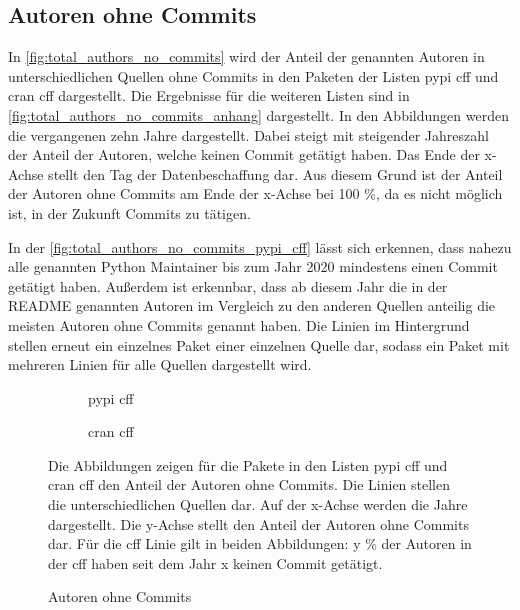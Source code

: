 \subsection*{Autoren ohne Commits}
In \autoref{fig:total_authors_no_commits} wird der Anteil der genannten Autoren in unterschiedlichen Quellen ohne Commits in den Paketen der Listen \gls{pypi} \gls{cff} und \gls{cran} \gls{cff} dargestellt.
Die Ergebnisse für die weiteren Listen sind in \autoref{fig:total_authors_no_commits_anhang} dargestellt.
In den Abbildungen werden die vergangenen zehn Jahre dargestellt.
Dabei steigt mit steigender Jahreszahl der Anteil der Autoren, welche keinen Commit getätigt haben.
Das Ende der x-Achse stellt den Tag der Datenbeschaffung dar.
Aus diesem Grund ist der Anteil der Autoren ohne Commits am Ende der x-Achse bei 100 \%, da es nicht möglich ist, in der Zukunft Commits zu tätigen.

In der \autoref{fig:total_authors_no_commits_pypi_cff} lässt sich erkennen, dass nahezu alle genannten Python Maintainer bis zum Jahr 2020 mindestens einen Commit getätigt haben.
Außerdem ist erkennbar, dass ab diesem Jahr die in der README genannten Autoren im Vergleich zu den anderen Quellen anteilig die meisten Autoren ohne Commits genannt haben.
Die Linien im Hintergrund stellen erneut ein einzelnes Paket einer einzelnen Quelle dar, sodass ein Paket mit mehreren Linien für alle Quellen dargestellt wird.

\begin{figure}
    \begin{subfigure}{.5\textwidth}
        \centering
        
        \caption{\gls{pypi} \gls{cff}}
        \label{fig:total_authors_no_commits_pypi_cff}
    \end{subfigure}%
    \begin{subfigure}{.5\textwidth}
        \centering
        
        \caption{\gls{cran} \gls{cff}}
        \label{fig:total_authors_no_commits_cran_cff}
    \end{subfigure}
    \caption{Autoren ohne Commits}
    \label{fig:total_authors_no_commits}
    \small
    Die Abbildungen zeigen für die Pakete in den Listen \gls{pypi} \gls{cff} und \gls{cran} \gls{cff} den Anteil der Autoren ohne Commits. Die Linien stellen die unterschiedlichen Quellen dar. Auf der x-Achse werden die Jahre dargestellt. Die y-Achse stellt den Anteil der Autoren ohne Commits dar. Für die \gls{cff} Linie gilt in beiden Abbildungen: y \% der Autoren in der \gls{cff} haben seit dem Jahr x keinen Commit getätigt.
\end{figure}

